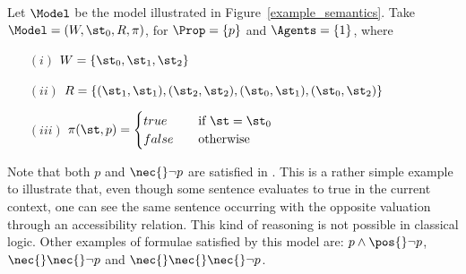 \begin{example}
    Let $\Model$ be the model illustrated in Figure~\ref{example_semantics}. Take
    $\Model = (W, \st_0, R, \pi)$, for $\Prop = \{p\}$ and $\Agents = \{1\}$,
    where 
    \begin{enumerate}
        \item[$(i)$] $W = \{\st_0, \st_1, \st_2\}$
        \item[$(ii)$] $R = \{(\st_1, \st_1), (\st_2, \st_2),
            (\st_0, \st_1), (\st_0, \st_2)\}$
        \item[$(iii)$] $ \pi(\st, p) = 
            \begin{cases} 
                true    & \quad \text{if } \st = \st_0\\
                false   & \quad \text{otherwise}
            \end{cases}
                       $
    \end{enumerate}

    Note that both $p$ and $\nec{} \neg p$ are satisfied in \Model. This is a
    rather simple example to illustrate that, even though some sentence
    evaluates to true in the current context, one can see the same sentence
    occurring with the opposite valuation through an accessibility relation.
    This kind of reasoning is not possible in classical logic. Other examples of
    formulae satisfied by this model are: $p \land \pos{} \neg p$, $\nec{}\nec{}
    \neg p$ and $\nec{} \nec {} \nec{} \neg p$.
\end{example}



